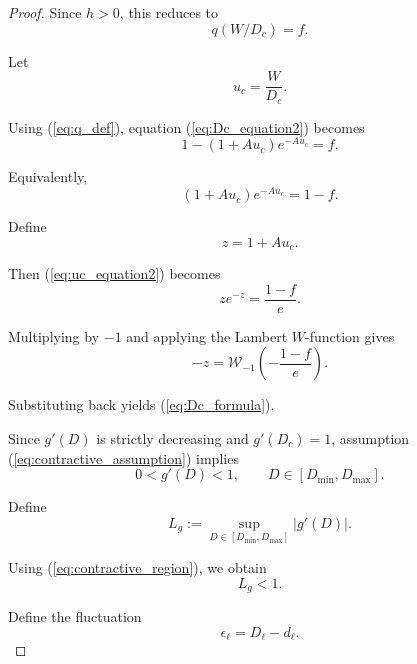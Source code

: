 \documentclass[10pt]{iopart}
\newcommand{\1}{\mathbf{1}}
\begin{document}
\begin{proof}
Since $h>0$, this reduces to
\begin{equation}
q(W/D_c)=f.
\label{eq:Dc_equation2}
\end{equation}

Let
\begin{equation}
u_c=\frac{W}{D_c}.
\label{eq:uc_def}
\end{equation}

Using (\ref{eq:q_def}), equation (\ref{eq:Dc_equation2}) becomes
\begin{equation}
1-(1+Au_c)e^{-Au_c}=f.
\label{eq:uc_equation}
\end{equation}

Equivalently,
\begin{equation}
(1+Au_c)e^{-Au_c}=1-f.
\label{eq:uc_equation2}
\end{equation}

Define
\begin{equation}
z=1+Au_c.
\label{eq:z_def}
\end{equation}

Then (\ref{eq:uc_equation2}) becomes
\begin{equation}
ze^{-z}=\frac{1-f}{e}.
\label{eq:z_equation}
\end{equation}

Multiplying by $-1$ and applying the Lambert $W$-function gives
\begin{equation}
-z
=
\mathcal W_{-1}
\left(
-\frac{1-f}{e}
\right).
\label{eq:z_solution}
\end{equation}

Substituting back yields (\ref{eq:Dc_formula}).

Since $g'(D)$ is strictly decreasing and $g'(D_c)=1$, assumption (\ref{eq:contractive_assumption}) implies
\begin{equation}
0<g'(D)<1,
\qquad
D\in[D_{\min},D_{\max}].
\label{eq:contractive_region}
\end{equation}

Define
\begin{equation}
L_g
:=
\sup_{D\in[D_{\min},D_{\max}]}
|g'(D)|.
\label{eq:Lg_def}
\end{equation}

Using (\ref{eq:contractive_region}), we obtain
\begin{equation}
L_g<1.
\label{eq:Lg_less_1}
\end{equation}

Define the fluctuation
\begin{equation}
\epsilon_\ell=D_\ell-d_\ell.
\label{eq:error_def}
\end{equation}


\end{proof}
\end{document}
